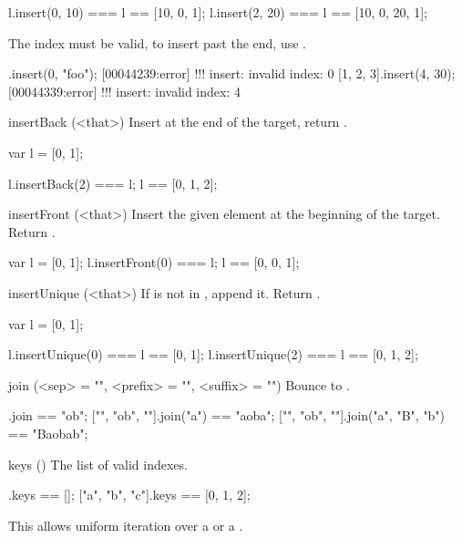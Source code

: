 \begin{urbiscriptapi}
\begin{urbiassert}
l.insert(0, 10) === l == [10, 0, 1];
l.insert(2, 20) === l == [10, 0, 20, 1];
\end{urbiassert}

  The index must be valid, to insert past the end, use .
\begin{urbiscript}
[].insert(0, "foo");
[00044239:error] !!! insert: invalid index: 0
[1, 2, 3].insert(4, 30);
[00044339:error] !!! insert: invalid index: 4
\end{urbiscript}


\item[insertBack](<that>)%
  Insert \that at the end of the target, return \this.

\begin{urbiassert}
var l = [0, 1];

l.insertBack(2) === l;
l == [0, 1, 2];
\end{urbiassert}


\item[insertFront](<that>)%
  Insert the given element at the beginning of the target.  Return \this.

\begin{urbiassert}
var l = [0, 1];
l.insertFront(0) === l;
l == [0, 0, 1];
\end{urbiassert}


\item[insertUnique](<that>)%
  If \that is not in \this, append it. Return \this.

\begin{urbiassert}
var l = [0, 1];

l.insertUnique(0) === l == [0, 1];
l.insertUnique(2) === l == [0, 1, 2];
\end{urbiassert}


\item[join](<sep> = "", <prefix> = "", <suffix> = "")%
  Bounce to .

\begin{urbiassert}
["", "ob", ""].join                == "ob";
["", "ob", ""].join("a")           == "aoba";
["", "ob", ""].join("a", "B", "b") == "Baobab";
\end{urbiassert}


\item[keys]()%
  The list of valid indexes.
\begin{urbiassert}
[].keys == [];
["a", "b", "c"].keys == [0, 1, 2];
\end{urbiassert}

This allows uniform iteration over a  or a
.


\end{urbiscriptapi}
